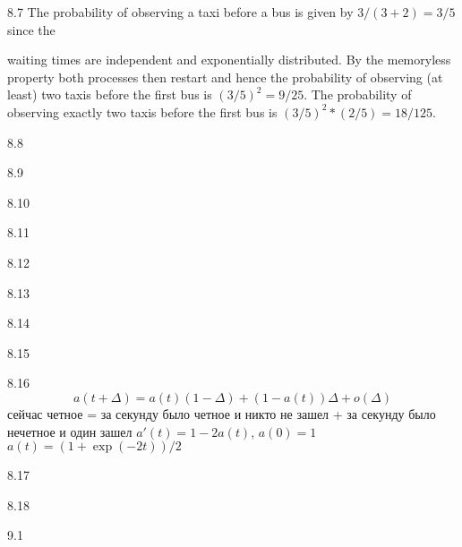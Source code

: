 \protect \hypertarget {soln:8.7}{}
\begin{solution}{{8.7}}
  The probability of observing a taxi before a bus is given by $3/(3+2)=3/5$ since the

  waiting times are independent and exponentially distributed. By the memoryless
  property both processes then restart and hence the probability of observing (at least)
  two taxis before the first bus is $(3/5)^2=9/25$. The probability of observing exactly
  two taxis before the first bus is $(3/5)^2*(2/5)=18/125$.
\end{solution}
\protect \hypertarget {soln:8.8}{}
\begin{solution}{{8.8}}
\end{solution}
\protect \hypertarget {soln:8.9}{}
\begin{solution}{{8.9}}
\end{solution}
\protect \hypertarget {soln:8.10}{}
\begin{solution}{{8.10}}
\end{solution}
\protect \hypertarget {soln:8.11}{}
\begin{solution}{{8.11}}
\end{solution}
\protect \hypertarget {soln:8.12}{}
\begin{solution}{{8.12}}
\end{solution}
\protect \hypertarget {soln:8.13}{}
\begin{solution}{{8.13}}
\end{solution}
\protect \hypertarget {soln:8.14}{}
\begin{solution}{{8.14}}
\end{solution}
\protect \hypertarget {soln:8.15}{}
\begin{solution}{{8.15}}
\end{solution}
\protect \hypertarget {soln:8.16}{}
\begin{solution}{{8.16}}
  \[ a(t+\Delta)=a(t)(1-\Delta)+(1-a(t))\Delta + o(\Delta) \]
  сейчас четное = за секунду было четное и никто не зашел + за секунду было нечетное и один зашел
  $a'(t)=1-2a(t)$, $a(0)=1$
  $a(t)=(1+\exp(-2t))/2$
\end{solution}
\protect \hypertarget {soln:8.17}{}
\begin{solution}{{8.17}}
\end{solution}
\protect \hypertarget {soln:8.18}{}
\begin{solution}{{8.18}}
\end{solution}
\protect \hypertarget {soln:9.1}{}
\begin{solution}{{9.1}}
\end{solution}
